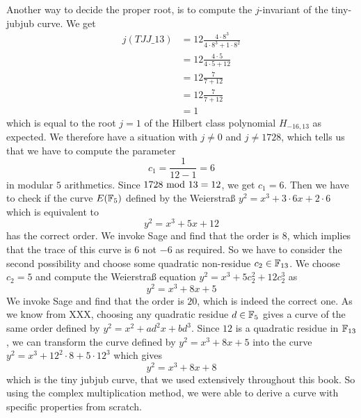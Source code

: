 \begin{example}
Another way to decide the proper root, is to compute the $j$-invariant of the tiny-jubjub curve. We get
\begin{align*}
j(\mathit{TJJ\_13}) & = 12\frac{4\cdot 8^3}{4\cdot 8^3+ 1\cdot 8^2}\\
                    & = 12\frac{4\cdot 5}{4\cdot 5+ 12}\\
                    & = 12\frac{7}{7+ 12}\\
                    & = 12\frac{7}{7+ 12}\\
                    & = 1
\end{align*}
which is equal to the root $j=1$ of the Hilbert class polynomial $H_{-16,13}$ as expected. We therefore have a situation with $j\neq 0$ and $j\neq 1728$, which tells us that we have to compute the parameter
$$
c_1=\frac{1}{12-1} = 6
$$
in modular $5$ arithmetics. Since $1728 \text{ mod } 13=12$, we get $c_1=6$. Then we have to check if the curve $E(\mathbb{F}_5)$ defined by the Weierstraß  $y^2 = x^3 + 3\cdot 6 x + 2\cdot 6$ which is equivalent to
$$
y^2 = x^3 + 5x +12
$$ has the correct order. We invoke Sage and find that the order is $8$, which implies that the trace of this curve is $6$ not $-6$ as required. So we have to consider the second possibility and choose some quadratic non-residue $c_2\in\mathbb{F}_{13}$. We choose $c_2=5$ and compute the Weierstraß equation $y^2 = x^3 + 5 c_2^2 + 12 c_2^3$ as
$$
y^2 = x^3 + 8 x + 5
$$
We invoke Sage and find that the order is $20$, which is indeed the correct one. As we know from XXX, choosing any quadratic residue $d\in \mathbb{F}_5$ gives a curve of the same order defined by $y^2 = x^2 + a d^2 x + bd^3$. Since $12$ is a quadratic residue in $\mathbb{F}_{13}$, we can transform the curve defined by 
$y^2 = x^3 +8x+5$ into the curve $y^2 = x^3 + 12^2\cdot 8 + 5\cdot 12^3$ which gives 
$$
y^2 = x^3 + 8x +8
$$
which is the tiny jubjub curve, that we used extensively throughout this book. So using the complex multiplication method, we were able to derive a curve with specific properties from scratch.
\end{example}
